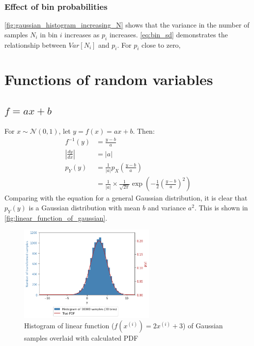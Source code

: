 \documentclass[a4paper]{article}
\begin{document}

\subsubsection{Effect of bin probabilities}
\autoref{fig:gaussian_histogram_increasing_N} shows that the variance in the number of samples $N_i$ in bin $i$
increases as $p_i$ increases.
\autoref{eq:bin_sd} demonstrates the relationship between $Var[N_i]$ and $p_i$.
For $p_i$ close to zero,



\section{Functions of random variables}

\subsection{$f = a x + b$}
For $x \sim \mathcal{N}(0, 1)$, let $y = f(x) = a x + b$. Then:
\begin{align*}
    f^{-1}(y) &= \frac{y - b}{a} \\
    \left|\frac{dy}{dx}\right| &= |a| \\
    p_Y(y) &= \frac{1}{|a|} p_X \left( \frac{y - b}{a} \right) \\
    &= \frac{1}{|a|}\times\frac{1}{\sqrt{2\pi}} \exp{\left( -\frac{1}{2} \left( \frac{y-b}{a} \right)^2 \right)}
\end{align*}
Comparing with the equation for a general Gaussian distribution, it is clear that $p_Y(y)$ is a Gaussian distribution
with mean $b$ and variance $a^2$. This is shown in \autoref{fig:linear_function_of_gaussian}.

\begin{figure}[h]
    \centering
    \includegraphics[width=0.6\textwidth]{figures/linear_function_of_gaussian.png}
    \caption{Histogram of linear function ($f(x^{(i)}) = 2x^{(i)} + 3$) of Gaussian samples overlaid with
    calculated PDF}
    \label{fig:linear_function_of_gaussian}
\end{figure}
\end{document}

